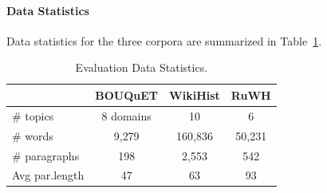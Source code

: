 \documentclass[11pt]{article}
\newcommand{\datasetWikipediaName}{WikiHist}
\newcommand{\datasetEncyclopediaName}{RuWH}
\begin{document}
\paragraph{Data Statistics} Data statistics for the three corpora are summarized in
Table~\ref{tab:data_statistics}. 



\begin{table}[t!]
\setlength{\tabcolsep}{2.25pt}
\centering
\begin{tabular}{l|c|c|c}

\toprule
\textbf{}  & \textbf{BOUQuET}  & \textbf{\datasetWikipediaName} & \textbf{\datasetEncyclopediaName} \\

\midrule
\# topics  & 8 domains & 10 &  6     \\
\# words  & 9{,}279 & 160{,}836 &  50{,}231     \\
\# paragraphs  & 198 & 2{,}553 &  542     \\
Avg par.length  & 47 & 63 &  93     \\

\bottomrule
\end{tabular}
\caption{Evaluation Data Statistics.}\label{tab:data_statistics}
\end{table}
\end{document}
